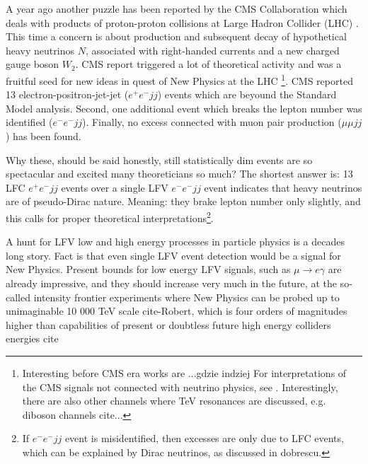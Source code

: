 \documentclass[twocolumn,superscriptaddress,showpacs,prl,nofootinbib,floatfix]{revtex4}
\begin{document}
A year ago  another puzzle has been reported by the CMS Collaboration  which deals with products of proton-proton collisions at Large Hadron Collider (LHC) \cite{Khachatryan:2014dka}.  This time a concern is about  production and subsequent decay of hypothetical  heavy neutrinos $N$,  associated with right-handed currents and a new charged gauge boson $W_2$. CMS report triggered a lot of theoretical activity
and  was a fruitful seed for new ideas in quest of New Physics at the LHC  \cite{Deppisch:2014qpa,Heikinheimo:2014tba, Deppisch:2014zta,Aguilar-Saavedra:2014ola, Ng:2015hba,Dobrescu:2015qna,Brehmer:2015cia,Dev:2015pga,Coloma:2015una,Gluza:2015goa,
Das:2014jxa} \footnote{Interesting before CMS era works are \cite{Han:2012vk, Atre:2009rg}...gdzie indziej For  interpretations of the CMS signals not connected with neutrino physics, see \cite{Berger:2015qra,Krauss:2015nba,Dhuria:2015swa}. Interestingly, there are also other channels where TeV resonances are discussed, e.g. diboson channels cite...}. 
CMS reported 13 electron-positron-jet-jet ($e^+e^-jj$) events which are beyound the Standard Model analysis. Second, one additional event which breaks the lepton number was identified ($e^-e^-jj$). Finally, no excess connected with muon pair production ($\mu \mu jj$) has been found. 

Why these, should be said honestly, still statistically dim events are so spectacular and excited many theoreticians so much? The shortest answer is: 13 LFC $e^+e^-jj$ events over a single LFV  $e^-e^-jj$ event indicates that heavy neutrinos are of pseudo-Dirac nature. Meaning: they brake lepton number only slightly, and this calls for proper theoretical interpretations\footnote{If $e^-e^-jj$ event is misidentified, then excesses are only due to LFC events, which can be explained by Dirac neutrinos, as discussed in dobrescu.}.  

A hunt for LFV low and high energy processes in particle physics is a decades long story. Fact is that even single LFV event detection  would be a signal for New Physics. Present bounds for low energy LFV signals, such as 
$\mu \to e \gamma$  are already impressive, and they should increase very much in the future, at the so-called intensity frontier experiments where
New Physics can be probed up to unimaginable 10 000 TeV scale cite-Robert, which is four orders of magnitudes higher  than capabilities of present or doubtless future high energy colliders energies cite 
 
\end{document}
